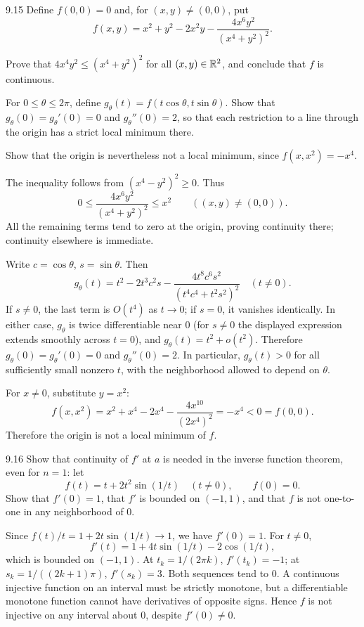 \documentclass[11pt,oneside]{article}
\begin{document}
\begin{exercise}{9.15}
Define $f(0,0)=0$ and, for $(x,y)\ne(0,0)$, put
\[
 f(x,y)=x^2+y^2-2x^2y-\frac{4x^6y^2}{(x^4+y^2)^2}.
\]
\begin{exercisesubparts}
\item Prove that $4x^4y^2\le(x^4+y^2)^2$ for all $(x,y)\in\mathbb{R}^2$, and conclude that $f$ is continuous.
\item For $0\le\theta\le2\pi$, define $g_\theta(t)=f(t\cos\theta,t\sin\theta)$. Show that $g_\theta(0)=g_\theta'(0)=0$ and $g_\theta''(0)=2$, so that each restriction to a line through the origin has a strict local minimum there.
\item Show that the origin is nevertheless not a local minimum, since $f(x,x^2)=-x^4$.
\end{exercisesubparts}
\end{exercise}
\begin{solution}
\begin{exercisesubparts}
\item The inequality follows from $(x^4-y^2)^2\ge0$. Thus
\[
 0\le\frac{4x^6y^2}{(x^4+y^2)^2}\le x^2
 \qquad((x,y)\ne(0,0)).
\]
All the remaining terms tend to zero at the origin, proving continuity there; continuity elsewhere is immediate.
\item Write $c=\cos\theta$, $s=\sin\theta$. Then
\[
 g_\theta(t)=t^2-2t^3c^2s-
 \frac{4t^8c^6s^2}{(t^4c^4+t^2s^2)^2}
 \quad(t\ne0).
\]
If $s\ne0$, the last term is $O(t^4)$ as $t\to0$; if $s=0$, it vanishes identically. In either case, $g_\theta$ is twice differentiable near $0$ (for $s\ne0$ the displayed expression extends smoothly across $t=0$), and
$g_\theta(t)=t^2+o(t^2)$. Therefore $g_\theta(0)=g_\theta'(0)=0$ and $g_\theta''(0)=2$. In particular, $g_\theta(t)>0$ for all sufficiently small nonzero $t$, with the neighborhood allowed to depend on $\theta$.
\item For $x\ne0$, substitute $y=x^2$:
\[
 f(x,x^2)=x^2+x^4-2x^4-
 \frac{4x^{10}}{(2x^4)^2}=-x^4<0=f(0,0).
\]
Therefore the origin is not a local minimum of $f$.
\end{exercisesubparts}
\end{solution}

\begin{exercise}{9.16}
Show that continuity of $f'$ at $a$ is needed in the inverse function theorem, even for $n=1$: let
\[
 f(t)=t+2t^2\sin(1/t)\quad(t\ne0),\qquad f(0)=0.
\]
Show that $f'(0)=1$, that $f'$ is bounded on $(-1,1)$, and that $f$ is not one-to-one in any neighborhood of $0$.
\end{exercise}
\begin{solution}
Since $f(t)/t=1+2t\sin(1/t)\to1$, we have $f'(0)=1$. For $t\ne0$,
\[
 f'(t)=1+4t\sin(1/t)-2\cos(1/t),
\]
which is bounded on $(-1,1)$. At $t_k=1/(2\pi k)$, $f'(t_k)=-1$; at $s_k=1/((2k+1)\pi)$, $f'(s_k)=3$. Both sequences tend to $0$. A continuous injective function on an interval must be strictly monotone, but a differentiable monotone function cannot have derivatives of opposite signs. Hence $f$ is not injective on any interval about $0$, despite $f'(0)\ne0$.
\end{solution}
\end{document}
